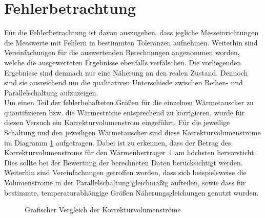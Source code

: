 \newpage
\section{Fehlerbetrachtung}
\label{sec:fehler}
Für die Fehlerbetrachtung ist davon auszugehen, dass jegliche Messeinrichtungen die Messwerte mit Fehlern in bestimmten Toleranzen aufnehmen. Weiterhin sind Vereinfachungen für die auswertenden Berechnungen angenommen worden, welche die ausgewerteten Ergebnisse ebenfalls verfälschen. Die vorliegenden Ergebnisse sind demnach nur eine Näherung an den realen Zustand. Dennoch sind sie ausreichend um die qualitativen Unterschiede zwischen Reihen- und Parallelschaltung aufzuzeigen.\\
Um einen Teil der fehlerbehafteten Größen für die einzelnen Wärmetauscher zu quantifizieren bzw. die Wärmeströme entsprechend zu korrigieren, wurde für diesen Versuch ein Korrekturvolumenstrom eingeführt. Für die jeweilige Schaltung und den jeweiligen Wärmetauscher sind diese Korrekturvolumenströme im Diagramm \ref{dia:korrrek} aufgetragen. Dabei ist zu erkennen, dass der Betrag des Korrekturvolumenstroms für den \mbox{Wärmeübertrager 1} am höchsten hervorsticht. Dies sollte bei der Bewertung der berechneten Daten berücksichtigt werden.\\
Weiterhin sind Vereinfachungen getroffen worden, dass sich beispielsweise die Volumenströme in der Parallelschaltung gleichmäßig aufteilen, sowie dass für bestimmte, temperaturabhängige Größen Näherungsgleichungen genutzt wurden.
\vspace*{-3mm}
\begin{figure}[h!]
	\begin{center}
		\caption{Grafischer Vergleich der Korrekturvolumenströme}
		\label{dia:korrrek}
	\end{center}
\end{figure}
\FloatBarrier

